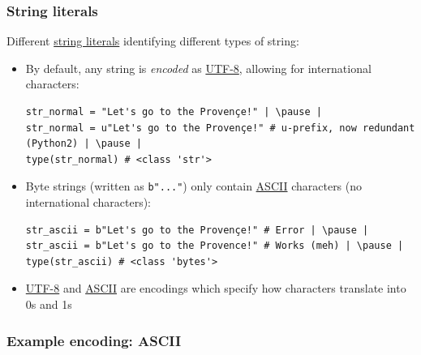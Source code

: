 \documentclass[xcolor=table]{beamer}
\begin{document}
\begin{frame}[fragile]
    \frametitle{String literals}
    Different \href{https://docs.python.org/3/reference/lexical_analysis.html#string-and-bytes-literals}{string literals} identifying different types of string:
\begin{itemize}
    \item By default, any string is \emph{encoded} as \href{https://docs.python.org/3/howto/unicode.html}{UTF-8}, allowing for international characters:
\begin{lstlisting}[style=python]
str_normal = "Let's go to the Provençe!" | \pause |
str_normal = u"Let's go to the Provençe!" # u-prefix, now redundant (Python2) | \pause |
type(str_normal) # <class 'str'>
\end{lstlisting}
\pause
    \item Byte strings (written as \texttt{b"..."}) only contain \href{https://en.wikipedia.org/wiki/ASCII}{ASCII} characters (no international characters):
\begin{lstlisting}[style=python]
str_ascii = b"Let's go to the Provençe!" # Error | \pause |
str_ascii = b"Let's go to the Provence!" # Works (meh) | \pause |
type(str_ascii) # <class 'bytes'>
\end{lstlisting}
\item \href{https://docs.python.org/3/howto/unicode.html}{UTF-8} and \href{https://en.wikipedia.org/wiki/ASCII}{ASCII} are encodings which specify how characters translate into 0s and 1s
\end{itemize}
\end{frame}
\begin{frame}[fragile]
    \frametitle{Example encoding: ASCII}
\begin{center}
\end{center}
\end{frame}
\end{document}
